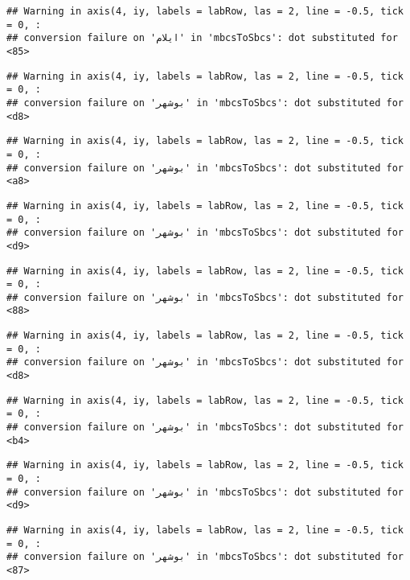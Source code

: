 \documentclass[
]{article}
\begin{document}
\begin{verbatim}
## Warning in axis(4, iy, labels = labRow, las = 2, line = -0.5, tick = 0, :
## conversion failure on 'ایلام' in 'mbcsToSbcs': dot substituted for <85>
\end{verbatim}

\begin{verbatim}
## Warning in axis(4, iy, labels = labRow, las = 2, line = -0.5, tick = 0, :
## conversion failure on 'بوشهر' in 'mbcsToSbcs': dot substituted for <d8>
\end{verbatim}

\begin{verbatim}
## Warning in axis(4, iy, labels = labRow, las = 2, line = -0.5, tick = 0, :
## conversion failure on 'بوشهر' in 'mbcsToSbcs': dot substituted for <a8>
\end{verbatim}

\begin{verbatim}
## Warning in axis(4, iy, labels = labRow, las = 2, line = -0.5, tick = 0, :
## conversion failure on 'بوشهر' in 'mbcsToSbcs': dot substituted for <d9>
\end{verbatim}

\begin{verbatim}
## Warning in axis(4, iy, labels = labRow, las = 2, line = -0.5, tick = 0, :
## conversion failure on 'بوشهر' in 'mbcsToSbcs': dot substituted for <88>
\end{verbatim}

\begin{verbatim}
## Warning in axis(4, iy, labels = labRow, las = 2, line = -0.5, tick = 0, :
## conversion failure on 'بوشهر' in 'mbcsToSbcs': dot substituted for <d8>
\end{verbatim}

\begin{verbatim}
## Warning in axis(4, iy, labels = labRow, las = 2, line = -0.5, tick = 0, :
## conversion failure on 'بوشهر' in 'mbcsToSbcs': dot substituted for <b4>
\end{verbatim}

\begin{verbatim}
## Warning in axis(4, iy, labels = labRow, las = 2, line = -0.5, tick = 0, :
## conversion failure on 'بوشهر' in 'mbcsToSbcs': dot substituted for <d9>
\end{verbatim}

\begin{verbatim}
## Warning in axis(4, iy, labels = labRow, las = 2, line = -0.5, tick = 0, :
## conversion failure on 'بوشهر' in 'mbcsToSbcs': dot substituted for <87>
\end{verbatim}
\end{document}
